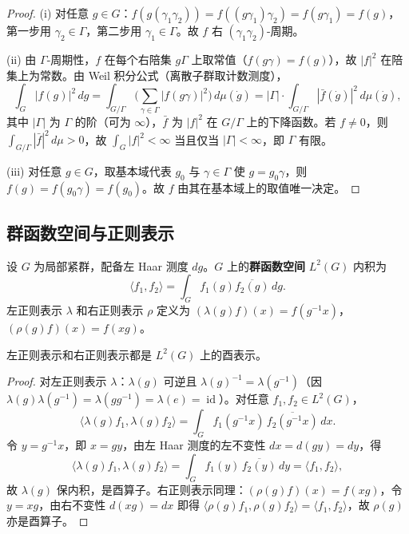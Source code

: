 \begin{proof}
(i) 对任意 $g\in G$：$f(g(\gamma_1\gamma_2))=f((g\gamma_1)\gamma_2)=f(g\gamma_1)=f(g)$，第一步用 $\gamma_2\in\Gamma$，第二步用 $\gamma_1\in\Gamma$。故 $f$ 右 $(\gamma_1\gamma_2)$-周期。

(ii) 由 $\Gamma$-周期性，$f$ 在每个右陪集 $g\Gamma$ 上取常值（$f(g\gamma)=f(g)$），故 $|f|^2$ 在陪集上为常数。由 Weil 积分公式（离散子群取计数测度），
\[
\int_G |f(g)|^2\,dg = \int_{G/\Gamma}\Big(\sum_{\gamma\in\Gamma}|f(g\gamma)|^2\Big)\,d\mu(\dot g) = |\Gamma|\cdot\int_{G/\Gamma}|\bar f(\dot g)|^2\,d\mu(\dot g),
\]
其中 $|\Gamma|$ 为 $\Gamma$ 的阶（可为 $\infty$），$\bar f$ 为 $|f|^2$ 在 $G/\Gamma$ 上的下降函数。若 $f\neq 0$，则 $\int_{G/\Gamma}|\bar f|^2\,d\mu>0$，故 $\int_G|f|^2<\infty$ 当且仅当 $|\Gamma|<\infty$，即 $\Gamma$ 有限。

(iii) 对任意 $g\in G$，取基本域代表 $g_0$ 与 $\gamma\in\Gamma$ 使 $g=g_0\gamma$，则 $f(g)=f(g_0\gamma)=f(g_0)$。故 $f$ 由其在基本域上的取值唯一决定。
\end{proof}

\subsection{群函数空间与正则表示}

\begin{definition}[群函数空间与正则表示]\label{def:group_function_space}
设 $G$ 为局部紧群，配备左 Haar 测度 $dg$。$G$ 上的\textbf{群函数空间} $L^2(G)$ 内积为
\[
\langle f_1, f_2 \rangle = \int_G f_1(g) \overline{f_2(g)} \, dg.
\]
左正则表示 $\lambda$ 和右正则表示 $\rho$ 定义为 $(\lambda(g) f)(x) = f(g^{-1} x)$，$(\rho(g) f)(x) = f(xg)$。
\end{definition}

\begin{proposition}[正则表示的酉性]\label{prop:regular_unitary}
左正则表示和右正则表示都是 $L^2(G)$ 上的酉表示。
\end{proposition}

\begin{proof}
对左正则表示 $\lambda$：$\lambda(g)$ 可逆且 $\lambda(g)^{-1}=\lambda(g^{-1})$（因 $\lambda(g)\lambda(g^{-1})=\lambda(gg^{-1})=\lambda(e)=\operatorname{id}$）。对任意 $f_1,f_2\in L^2(G)$，
\[
\langle \lambda(g)f_1,\lambda(g)f_2\rangle = \int_G f_1(g^{-1}x)\,\overline{f_2(g^{-1}x)}\,dx.
\]
令 $y=g^{-1}x$，即 $x=gy$，由左 Haar 测度的左不变性 $dx=d(gy)=dy$，得
\[
\langle \lambda(g)f_1,\lambda(g)f_2\rangle = \int_G f_1(y)\,\overline{f_2(y)}\,dy = \langle f_1,f_2\rangle,
\]
故 $\lambda(g)$ 保内积，是酉算子。右正则表示同理：$(\rho(g)f)(x)=f(xg)$，令 $y=xg$，由右不变性 $d(xg)=dx$ 即得 $\langle\rho(g)f_1,\rho(g)f_2\rangle=\langle f_1,f_2\rangle$，故 $\rho(g)$ 亦是酉算子。
\end{proof}

